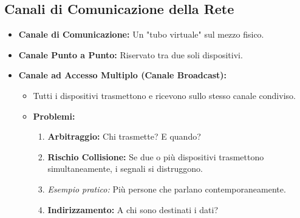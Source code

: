 \subsection{Canali di Comunicazione della Rete}
\begin{itemize}
    \item \textbf{Canale di Comunicazione:} Un "tubo virtuale" sul mezzo fisico.
    \item \textbf{Canale Punto a Punto:} Riservato tra due soli dispositivi.
    \item \textbf{Canale ad Accesso Multiplo (Canale Broadcast):}
    \begin{itemize}
        \item Tutti i dispositivi trasmettono e ricevono sullo stesso canale condiviso.
        \item \textbf{Problemi:}
        \begin{enumerate}
            \item \textbf{Arbitraggio:} Chi trasmette? E quando?
            \item \textbf{Rischio Collisione:} Se due o più dispositivi trasmettono simultaneamente, i segnali si distruggono.
            \item \textit{Esempio pratico:} Più persone che parlano contemporaneamente.
            \item \textbf{Indirizzamento:} A chi sono destinati i dati?
        \end{enumerate}
    \end{itemize}
\end{itemize}

